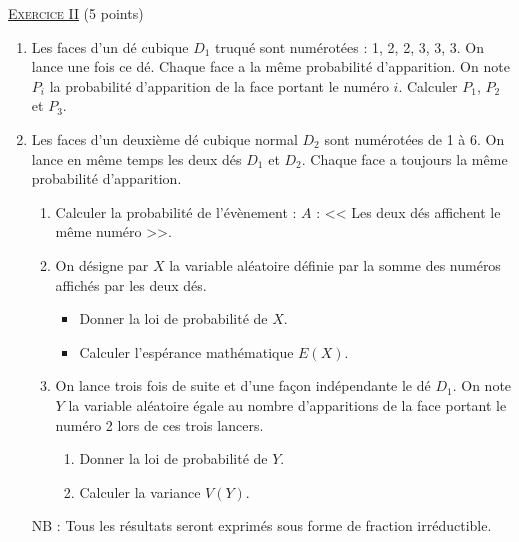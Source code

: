 \noindent \underline{\textsc{Exercice II}} (5 points) 
      \begin{enumerate}
            \item Les faces d'un d\'e cubique $D_1$ truqu\'e sont num\'erot\'ees : 1, 2, 2, 3, 3, 3.
                  On lance une fois ce d\'e.
                  Chaque face a la m\^eme probabilit\'e d'apparition.
                  On note $P_i$ la probabilit\'e d'apparition de la face portant le num\'ero $i$.
                  Calculer $P_1$, $P_2$ et $P_3$.
            \item Les faces d'un deuxi\`eme d\'e cubique normal $D_2$ sont num\'erot\'ees de 1 \`a 6.
                  On lance en m\^eme temps les deux d\'es $D_1$ et $D_2$.
                  Chaque face a toujours la m\^eme probabilit\'e d'apparition.
                  \begin{enumerate}
                        \item Calculer la probabilit\'e de l'\'ev\`enement : 
                              $A$ : << Les deux d\'es affichent le m\^eme num\'ero >>.
                        \item On d\'esigne par $X$ la variable al\'eatoire d\'efinie par la somme des num\'eros affich\'es
                              par les deux d\'es.
                              \begin{itemize}
                                    \item Donner la loi de probabilit\'e de $X$.
                                    \item Calculer l'esp\'erance math\'ematique $E(X)$.
                              \end{itemize}
                        \item On lance trois fois de suite et d'une fa\c{c}on ind\'ependante le d\'e $D_1$.
                              On note $Y$ la variable al\'eatoire \'egale au 
                              nombre d'apparitions de la face portant le num\'ero 2 lors de ces trois lancers.
                              \begin{enumerate}
                                    \item Donner la loi de probabilit\'e de $Y$.
                                    \item Calculer la variance $V(Y)$.
                              \end{enumerate}
                  \end{enumerate}
            \begin{center}
                  NB : Tous les r\'esultats seront exprim\'es sous forme de fraction irr\'eductible.
            \end{center}
      \end{enumerate}
